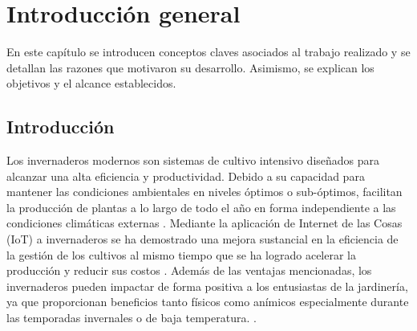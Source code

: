 
\chapter{Introducción general} %

\label{Chapter1} %
\label{IntroGeneral}


\newcommand{\keyword}[1]{\textbf{#1}}
\newcommand{\tabhead}[1]{\textbf{#1}}
\newcommand{\code}[1]{\texttt{#1}}
\newcommand{\file}[1]{\texttt{\bfseries#1}}
\newcommand{\option}[1]{\texttt{\itshape#1}}
\newcommand{\grados}{$^{\circ}$}


En este capítulo se introducen conceptos claves asociados al trabajo realizado y se detallan las razones que motivaron su desarrollo. Asimismo, se explican los objetivos y el alcance establecidos.
\section{Introducción}
\label{Introducción}

Los invernaderos modernos son sistemas de cultivo intensivo diseñados para alcanzar una alta eficiencia y productividad. Debido a su capacidad para mantener las condiciones ambientales en niveles óptimos o sub-óptimos, facilitan la producción de plantas a lo largo de todo el año en forma independiente a las condiciones climáticas externas \citep{HistoryofControlledEnvironmentHorticultureGreenhouses}.
Mediante la aplicación de Internet de las Cosas (IoT) a invernaderos se ha demostrado una mejora sustancial en la eficiencia de la gestión de los cultivos al mismo tiempo que se ha logrado acelerar la producción y reducir sus costos \citep{IoTparaInvernaderos}.
Además de las ventajas mencionadas, los invernaderos pueden impactar de forma positiva a los entusiastas de la jardinería, ya que proporcionan beneficios tanto físicos como anímicos especialmente durante las temporadas invernales o de baja temperatura. \citep{GreenHousesForHomeOwnersAndGardeners}. \\


